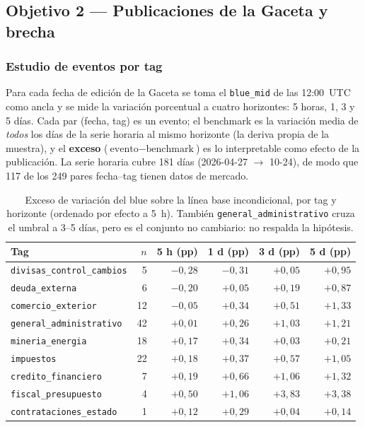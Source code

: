 \FloatBarrier
\subsection{Objetivo 2 --- Publicaciones de la Gaceta y brecha}

\subsubsection{Estudio de eventos por tag}

Para cada fecha de edición de la Gaceta se toma el \texttt{blue\_mid} de las
12:00~UTC como ancla y se mide la variación porcentual a cuatro horizontes: 5
horas, 1, 3 y 5 días. Cada par (fecha, tag) es un evento; el benchmark es la
variación media de \emph{todos} los días de la serie horaria al mismo
horizonte (la deriva propia de la muestra), y el \textbf{exceso}
($\text{evento} - \text{benchmark}$) es lo interpretable como efecto de la
publicación. La serie horaria cubre 181 días (2026-04-27 $\rightarrow$
10-24), de modo que 117 de los 249 pares fecha--tag tienen datos de mercado.

\begin{table}[!ht]
\centering\small
\begin{tabular}{@{}lrrrrr@{}}
\toprule
Tag & $n$ & 5 h (pp) & 1 d (pp) & 3 d (pp) & 5 d (pp) \\
\midrule
\texttt{divisas\_control\_cambios} & 5  & $-0{,}28$ & $-0{,}31$ & $+0{,}05$ & $+0{,}95$ \\
\texttt{deuda\_externa}            & 6  & $-0{,}20$ & $+0{,}05$ & $+0{,}19$ & $+0{,}87$ \\
\texttt{comercio\_exterior}        & 12 & $-0{,}05$ & $+0{,}34$ & $+0{,}51$ & $+1{,}33$ \\
\texttt{general\_administrativo}   & 42 & $+0{,}01$ & $+0{,}26$ & $+1{,}03$ & $+1{,}21$ \\
\texttt{mineria\_energia}          & 18 & $+0{,}17$ & $+0{,}34$ & $+0{,}03$ & $+0{,}21$ \\
\texttt{impuestos}                 & 22 & $+0{,}18$ & $+0{,}37$ & $+0{,}57$ & $+1{,}05$ \\
\texttt{credito\_financiero}       & 7  & $+0{,}19$ & $+0{,}66$ & $+1{,}06$ & $+1{,}32$ \\
\texttt{fiscal\_presupuesto}       & 4  & $+0{,}50$ & $+1{,}06$ & $+3{,}83$ & $+3{,}38$ \\
\texttt{contrataciones\_estado}    & 1  & $+0{,}12$ & $+0{,}29$ & $+0{,}04$ & $+0{,}14$ \\
\bottomrule
\end{tabular}
\caption{Exceso de variación del blue sobre la línea base incondicional, por
tag y horizonte (ordenado por efecto a 5~h). También
\texttt{general\_administrativo} cruza el umbral a 3--5 días, pero es el
conjunto no cambiario: no respalda la hipótesis.}
\label{tab:eventos}
\end{table}

